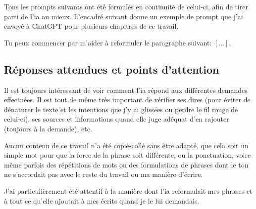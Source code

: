 Tous les prompts suivants ont été formulés en continuité de celui-ci, afin de tirer parti de l'\acrshort{ia} au mieux.
L'encadré suivant donne un exemple de prompt que j'ai envoyé à ChatGPT pour plusieurs chapitres de ce travail.
\begin{boxitup}
Tu peux commencer par m'aider à reformuler le paragraphe suivant: $[...]$.
\end{boxitup}

\subsection{Réponses attendues et points d'attention}
Il est toujours intéressant de voir comment l'\acrshort{ia} répond aux différentes demandes effectuées.
Il est tout de même très important de vérifier ses dires (pour éviter de dénaturer le texte et les intentions que j'y ai glissées ou perdre le fil rouge de celui-ci), ses sources et informations quand elle juge adéquat d'en rajouter (toujours à la demande), etc.

Aucun contenu de ce travail n'a été copié-collé sans être adapté, que cela soit un simple mot pour que la force de la phrase soit différente, ou la ponctuation, voire même parfois des répétitions de mots ou des formulations de phrases dont le ton ne s'accordait pas avec le reste du travail ou ma manière d'écrire.

J'ai particulièrement été attentif à la manière dont l'\acrshort{ia} reformulait mes phrases et à tout ce qu'elle ajoutait à mes écrits quand je le lui demandais.

